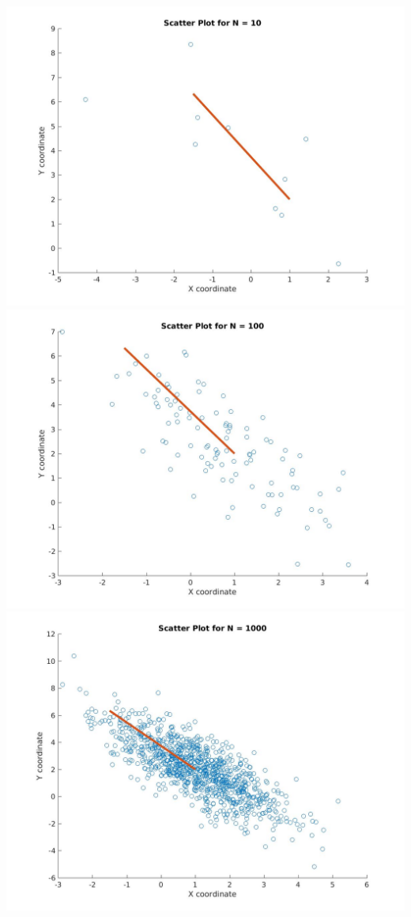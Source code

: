 \documentclass[12pt, a4paper]{article}
\begin{document}
\noindent \includegraphics[width=\textwidth, height = 0.25\paperheight]{Scatter_10}
\includegraphics[width=\textwidth, height = 0.25\paperheight]{Scatter_100}
\includegraphics[width=\textwidth, height = 0.25\paperheight]{Scatter_1000}
\end{document}
